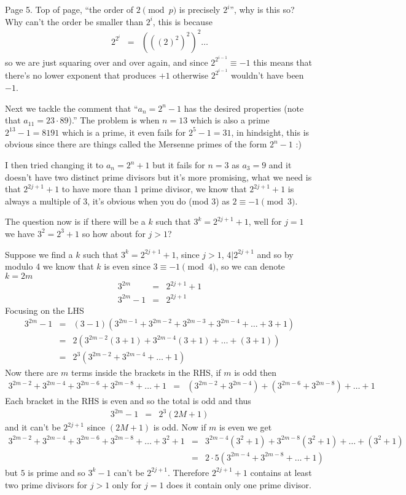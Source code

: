 \documentclass[aps,preprint,preprintnumbers,nofootinbib,showpacs,prd]{revtex4-1}
\newcommand{\nbea}{\begin{eqnarray*}}
\newcommand{\neea}{\end{eqnarray*}}
\begin{document}
{Page 5}. Top of page, ``the order of $2 \pmod{p}$ is precisely $2^i$'', why is this so? Why can't the order be smaller than $2^i$, this is because
%
\nbea
2^{2^i} & = & \left(\left(\left(2\right)^2\right)^2\right)^2\dots
\neea
%
so we are just squaring over and over again, and since $2^{2^{i-1}} \equiv -1$ this means that there's no lower exponent that produces $+1$ otherwise $2^{2^{i-1}}$ wouldn't have been $-1$.

Next we tackle the comment that ``$a_n = 2^n - 1$ has the desired properties (note that $a_{11} = 23\cdot89$).'' The problem is when $n=13$ which is also a prime $2^{13}-1=8191$ which is a prime, it even fails for $2^5 - 1 = 31$, in hindsight, this is obvious since there are things called the Mersenne primes  of the form $2^n - 1$ :)

I then tried changing it to $a_n = 2^n + 1$ but it fails for $n=3$ as $a_3 = 9$ and it doesn't have two distinct prime divisors but it's more promising, what we need is that $2^{2j+1} + 1$ to have more than 1 prime divisor, we know that $2^{2j+1} + 1$ is always a multiple of 3, it's obvious when you do (mod 3) as $2 \equiv -1 \pmod{3}$.

The question now is if there will be a $k$ such that $3^k = 2^{2j+1} + 1$, well for $j=1$ we have $3^2 = 2^3 + 1$ so how about for $j > 1$?

Suppose we find a $k$ such that $3^k = 2^{2j+1} + 1$, since $j > 1$, $4|2^{2j+1}$ and so by modulo 4 we know that $k$ is even since $3 \equiv -1 \pmod{4}$, so we can denote $k = 2m$
%
\nbea
3^{2m} & = & 2^{2j+1} + 1 \\
3^{2m} - 1 & = & 2^{2j+1}
\neea
%
Focusing on the LHS
%
\nbea
3^{2m} - 1 & = & (3 - 1)(3^{2m-1} + 3^{2m-2} + 3^{2m-3} + 3^{2m-4} + \dots + 3 + 1) \\
& = & 2(3^{2m-2} (3 + 1) + 3^{2m-4}(3 + 1) + \dots + (3 + 1)) \\
& = & 2^3(3^{2m-2} + 3^{2m-4} + \dots + 1)
\neea
%
Now there are $m$ terms inside the brackets in the RHS, if $m$ is odd then
%
\nbea
3^{2m-2} + 3^{2m-4} + 3^{2m-6} + 3^{2m-8} + \dots + 1 & = & (3^{2m-2} + 3^{2m-4}) + (3^{2m-6} + 3^{2m-8}) + \dots + 1 
\neea
%
Each bracket in the RHS is even and so the total is odd and thus
%
\nbea
3^{2m} - 1 & = & 2^3(2M+1)
\neea
%
and it can't be $2^{2j+1}$ since $(2M+1)$ is odd. Now if $m$ is even we get
%
\nbea
3^{2m-2} + 3^{2m-4} + 3^{2m-6} + 3^{2m-8} + \dots + 3^2 + 1 & = & 3^{2m-4}(3^2 + 1) + 3^{2m-8}(3^2 + 1) + \dots + (3^2 + 1) \\
& = & 2\cdot5(3^{2m-4} + 3^{2m-8} + \dots + 1)
\neea
%
but $5$ is prime and so $3^k - 1$ can't be $2^{2j+1}$. Therefore $2^{2j+1} + 1$ contains at least two prime divisors for $j > 1$ only for $j=1$ does it contain only one prime divisor.
\end{document}
